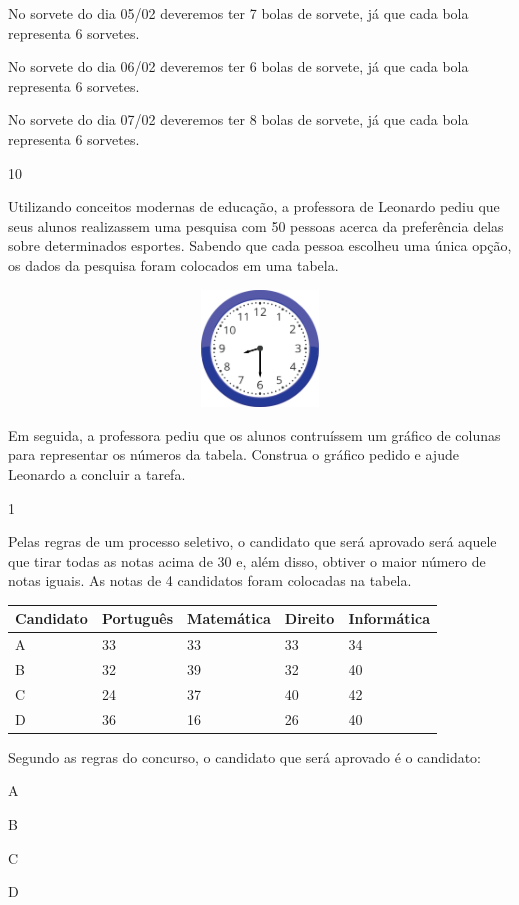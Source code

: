 \begin{escolha}
{\begin{escolha}
{{No sorvete do dia 05/02 deveremos ter 7 bolas de sorvete, já que cada
bola representa 6 sorvetes.

No sorvete do dia 06/02 deveremos ter 6 bolas de sorvete, já que cada
bola representa 6 sorvetes.

No sorvete do dia 07/02 deveremos ter 8 bolas de sorvete, já que cada
bola representa 6 sorvetes.}

\num{10}

Utilizando conceitos modernas de educação, a professora de Leonardo
pediu que seus alunos realizassem uma pesquisa com 50 pessoas acerca da
preferência delas sobre determinados esportes. Sabendo que cada pessoa
escolheu uma única opção, os dados da pesquisa foram colocados em uma tabela.


\includegraphics[width=5.39213in,height=1.22511in]{media/image100.png}

Em seguida, a professora pediu que os alunos contruíssem um gráfico de
colunas para representar os números da tabela. Construa o gráfico pedido
e ajude Leonardo a concluir a tarefa.



\num{1}

Pelas regras de um processo seletivo, o candidato que será aprovado será
aquele que tirar todas as notas acima de 30 e, além disso, obtiver o maior
número de notas iguais. As notas de 4 candidatos foram colocadas na
tabela.

\begin{longtable}[]{@{}lllll@{}}
\toprule
Candidato & Português & Matemática & Direito &
Informática\tabularnewline
\midrule
\endhead
A & 33 & 33 & 33 & 34\tabularnewline
B & 32 & 39 & 32 & 40\tabularnewline
C & 24 & 37 & 40 & 42\tabularnewline
D & 36 & 16 & 26 & 40\tabularnewline
\bottomrule
\end{longtable}

Segundo as regras do concurso, o candidato que será aprovado é o
candidato:

\begin{escolha}
\item
  A
\item
  B
\item
  C
\item
  D
\end{escolha}

}
\end{escolha}}
\end{escolha}
